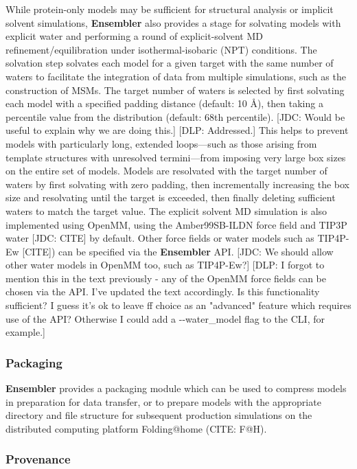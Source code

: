 \documentclass[aps,pre,twocolumn,nofootinbib,superscriptaddress,linenumbers]{revtex4-1}
\begin{document}
While protein-only models may be sufficient for structural analysis or implicit solvent simulations, {\bf Ensembler} also provides a stage for solvating models with explicit water and performing a round of explicit-solvent MD refinement/equilibration under isothermal-isobaric (NPT) conditions.
The solvation step solvates each model for a given target with the same number of waters to facilitate the integration of data from multiple simulations, such as the construction of MSMs.
The target number of waters is selected by first solvating each model with a specified padding distance (default: 10 \AA), then taking a percentile value from the distribution (default: 68th percentile).
{\color{red}[JDC: Would be useful to explain why we are doing this.]}
{\color{blue}[DLP: Addressed.]}
This helps to prevent models with particularly long, extended loops---such as those arising from template structures with unresolved termini---from imposing very large box sizes on the entire set of models.
Models are resolvated with the target number of waters by first solvating with zero padding, then incrementally increasing the box size and resolvating until the target is exceeded, then finally deleting sufficient waters to match the target value.
The explicit solvent MD simulation is also implemented using OpenMM, using the Amber99SB-ILDN force field and TIP3P water {\color{red}[JDC: CITE]} by default.
Other force fields or water models such as TIP4P-Ew {\color{red}[CITE]}) can be specified via the {\bf Ensembler} API.
{\color{red}[JDC: We should allow other water models in OpenMM too, such as TIP4P-Ew?]}
{\color{blue}[DLP: I forgot to mention this in the text previously - any of the OpenMM force fields can be chosen via the API. I've updated the text accordingly. Is this functionality sufficient? I guess it's ok to leave ff choice as an "advanced" feature which requires use of the API? Otherwise I could add a -{}-water\_model flag to the CLI, for example.]}

\subsubsection*{Packaging}

{\bf Ensembler} provides a packaging module which can be used to compress models in preparation for data transfer, or to prepare models with the appropriate directory and file structure for subsequent production simulations on the distributed computing platform Folding@home (CITE: F@H).

\subsubsection*{Provenance}
\end{document}
